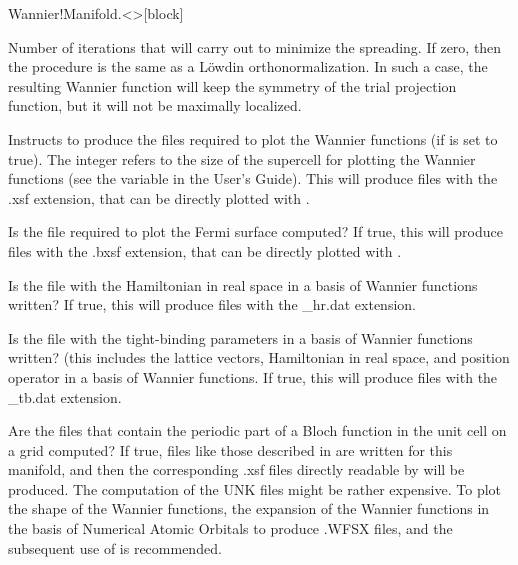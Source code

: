 \begin{fdfentry}{Wannier!Manifold.<>}[block]
\begin{fdfoptions}
      Number of iterations that 
      will carry out to minimize the spreading.
      If zero, then the procedure is the same as a L\"owdin orthonormalization.
      In such a case, the resulting Wannier function will keep the symmetry
      of the trial projection function, but it will not be maximally localized.


      Instructs  to produce the files
      required to plot the Wannier functions
      (if  is set to true).
      The integer refers to the size of the supercell for plotting the
      Wannier functions (see the variable
       in the  User's Guide).
      This will produce files with the .xsf extension, that can be directly plotted
      with .


      Is the file required to plot the Fermi surface computed?
      If true, this will produce files with the .bxsf extension, that can be directly plotted
      with .

      \option[write-hr]%

      Is the file with the Hamiltonian in real space in a basis of Wannier functions written?
      If true, this will produce files with the \_hr.dat extension.


      \option[write-tb]%

      Is the file with the tight-binding parameters in a basis of Wannier functions written?
      (this includes the lattice vectors, Hamiltonian
      in real space, and position operator in a basis of Wannier functions.
      If true, this will produce files with the \_tb.dat extension.


      Are the files that contain the periodic part
      of a Bloch function in the unit cell on a grid computed?
      If true, files like those described in 
      are written for this manifold, and then
      the corresponding .xsf files directly readable by 
      will be produced.
      The computation of the UNK files might be rather expensive.
      To plot the shape of the Wannier functions, the expansion of the Wannier functions
      in the basis of Numerical Atomic Orbitals to produce .WFSX files, and the
      subsequent use of  is recommended.


\end{fdfoptions}
\end{fdfentry}
